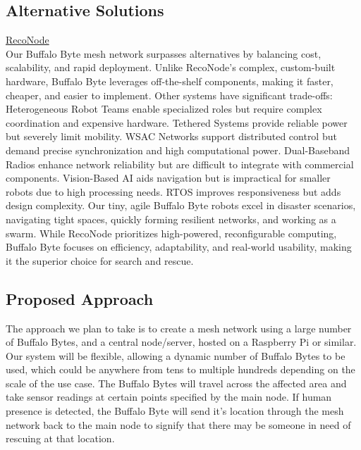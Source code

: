 \documentclass[10pt]{article}
\begin{document}
\subsection*{Alternative Solutions}
\underline{RecoNode} \cite{RecoNode}\\[0.2\baselineskip]
Our Buffalo Byte mesh network surpasses alternatives by balancing cost, scalability, and rapid deployment. Unlike RecoNode’s complex, custom-built hardware, Buffalo Byte leverages off-the-shelf components, making it faster, cheaper, and easier to implement. Other systems have significant trade-offs: Heterogeneous Robot Teams enable specialized roles but require complex coordination and expensive hardware. Tethered Systems provide reliable power but severely limit mobility. WSAC Networks support distributed control but demand precise synchronization and high computational power. Dual-Baseband Radios enhance network reliability but are difficult to integrate with commercial components. Vision-Based AI aids navigation but is impractical for smaller robots due to high processing needs. RTOS improves responsiveness but adds design complexity. Our tiny, agile Buffalo Byte robots excel in disaster scenarios, navigating tight spaces, quickly forming resilient networks, and working as a swarm. While RecoNode prioritizes high-powered, reconfigurable computing, Buffalo Byte focuses on efficiency, adaptability, and real-world usability, making it the superior choice for search and rescue.
\subsection*{Proposed Approach}
The approach we plan to take is to create a mesh network using a large number of Buffalo Bytes, and a central node/server, hosted on a Raspberry Pi or similar. Our system will be flexible, allowing a dynamic number of Buffalo Bytes to be used, which could be anywhere from tens to multiple hundreds depending on the scale of the use case. The Buffalo Bytes will travel across the affected area and take sensor readings at certain points specified by the main node. If human presence is detected, the Buffalo Byte will send it's location through the mesh network back to the main node to signify that there may be someone in need of rescuing at that location.
\end{document}
